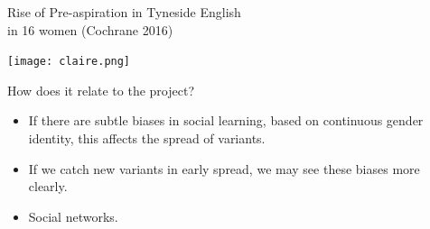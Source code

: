 \documentclass[hyperref={pdfpagelabels=false}]{beamer}
\begin{document}
\begin{frame}{Rise of Pre-aspiration in Tyneside English \\ in 16 women \small{(Cochrane 2016)}}


\begin{center}

\texttt{[image: claire.png]}

\end{center}
\end{frame}


\begin{frame}{How does it relate to the project?}
		\begin{itemize}
			\item If there are subtle biases in social learning, based on continuous gender identity, this affects the spread of variants.
			\item If we catch new variants in early spread, we may see these biases more clearly.
			\item Social networks.
		\end{itemize}
\end{frame}


\end{document}
